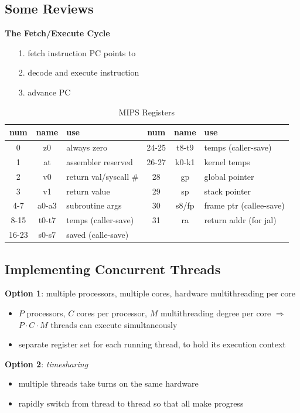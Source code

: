 \documentclass[12pt]{article}
\theoremstyle{plain}
\theoremstyle{definition}
\begin{document}
\subsection{Some Reviews}
\textbf{The Fetch/Execute Cycle}
\begin{enumerate}
  \item[1.] fetch instruction PC points to
  \item[2.] decode and execute instruction
  \item[3.] advance PC
\end{enumerate}

\begin{table}[H]
  \vspace{-20pt}
  \caption{MIPS Registers}
  \centering

  \begin{tabular}{|c|c|l||c|c|l|}
  \hline
  num & name & use & num & name & use \\ \hline
  0 & z0 & always zero & 24-25 & t8-t9 & temps (caller-save) \\ \hline
  1 & at & assembler reserved & 26-27 & k0-k1 & kernel temps \\ \hline
  2 & v0 & return val/syscall \# & 28 & gp & global pointer \\ \hline
  3 & v1 & return value & 29 & sp & stack pointer \\ \hline
  4-7 & a0-a3 & subroutine args & 30 & s8/fp & frame ptr (callee-save) \\ \hline
  8-15 & t0-t7 & temps (caller-save) & 31 & ra & return addr (for jal) \\ \hline
  16-23 & s0-s7 & saved (calle-save) & & &  \\ \hline
  \end{tabular}
\end{table}

\subsection{Implementing Concurrent Threads}
\textbf{Option 1}: multiple processors, multiple cores, hardware multithreading per core
\begin{itemize}
  \item $P$ processors, $C$ cores per processor, $M$ multithreading degree per core $\Rightarrow$ $P \cdot C \cdot M$ threads can execute simultaneously
  \item separate register set for each running thread, to hold its execution context
\end{itemize}
\textbf{Option 2}: \emph{timesharing}
\begin{itemize}
  \item multiple threads take turns on the same hardware
  \item rapidly switch from thread to thread so that all make progress
\end{itemize}
\end{document}
